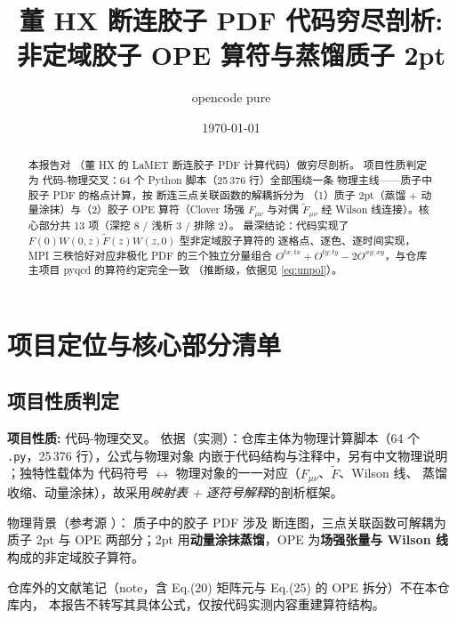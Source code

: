 \documentclass[UTF8]{ctexart}
\title{董 HX 断连胶子 PDF 代码穷尽剖析: 非定域胶子 OPE 算符与蒸馏质子 2pt}
\author{opencode pure}
\date{\today}
\begin{document}
\maketitle

\begin{abstract}
本报告对 \texttt{}（董 HX 的 LaMET 断连胶子 PDF 计算代码）做穷尽剖析。
项目性质判定为 \textcolor{phys}{代码-物理交叉}：64 个 Python 脚本（25\,376 行）全部围绕一条
物理主线——质子中胶子 PDF 的格点计算，按 \textcolor{phys}{断连三点关联函数的解耦}拆分为
（1）质子 2pt（蒸馏 + 动量涂抹）与（2）胶子 OPE 算符（Clover 场强 $F_{\mu\nu}$ 与对偶
$\widetilde{F}_{\mu\nu}$ 经 Wilson 线连接）。核心部分共 13 项（深挖 8 / 浅析 3 / 排除 2）。
最深结论：代码实现了 \textcolor{phys}{$F(0)W(0,z)\widetilde F(z)W(z,0)$ 型非定域胶子算符}的
逐格点、逐色、逐时间实现，MPI 三秩恰好对应非极化 PDF 的三个独立分量组合
$O^{tx;tx}+O^{ty;ty}-2O^{xy;xy}$，与仓库主项目 pyqcd 的算符约定完全一致
（\textcolor{phys}{推断}级，依据见 \eqref{eq:unpol}）。
\end{abstract}

\tableofcontents

\section{项目定位与核心部分清单}
\subsection{项目性质判定}
\begin{keybox}
\textbf{项目性质:} \textcolor{phys}{代码-物理交叉}。
依据（实测）：仓库主体为物理计算脚本（64 个 \texttt{.py}，25\,376 行），公式与物理对象
内嵌于代码结构与注释中，另有中文物理说明 \texttt{}；独特性载体为
代码符号 $\leftrightarrow$ 物理对象的一一对应（$F_{\mu\nu}$、$\widetilde F$、Wilson 线、
蒸馏收缩、动量涂抹），故采用\emph{映射表 + 逐符号解释}的剖析框架。
\end{keybox}

物理背景（\textcolor{evidence}{参考源} \texttt{}）：
质子中的胶子 PDF 涉及 \textcolor{phys}{断连图}，三点关联函数可解耦为质子 2pt 与 OPE
两部分；2pt 用\textbf{动量涂抹蒸馏}，OPE 为\textbf{场强张量与 Wilson 线}构成的非定域胶子算符。
\begin{refbox}
仓库外的文献笔记（note，含 Eq.(20) 矩阵元与 Eq.(25) 的 OPE 拆分）不在本仓库内，
本报告不转写其具体公式，仅按代码实测内容重建算符结构。
\end{refbox}
\end{document}
